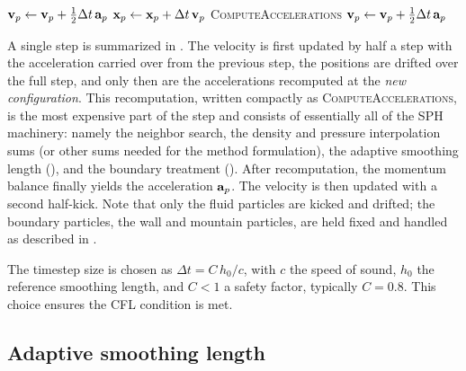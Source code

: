 \documentclass[../main.tex]{subfiles}
\begin{document}
\begin{algorithm}
	\caption{One Störmer--Verlet kick--move--kick step advancing the particle system by a time increment $\Delta t$.}
	\label{alg:VERLET}
	\begin{algobox}
	\begin{algorithmic}[1]
				\State $\mathbf{v}_p \gets \mathbf{v}_p + \tfrac{1}{2}\Delta t\, \mathbf{a}_p$ 
			\EndFor
				\State $\mathbf{x}_p \gets \mathbf{x}_p + \Delta t\, \mathbf{v}_p$ 
			\EndFor
			\State \textsc{ComputeAccelerations} 
				\State $\mathbf{v}_p \gets \mathbf{v}_p + \tfrac{1}{2}\Delta t\, \mathbf{a}_p$ 
			\EndFor
		\EndProcedure
	\end{algorithmic}
	\end{algobox}
\end{algorithm}

A single step is summarized in . The velocity is first updated by half a step with the acceleration carried over from the previous step, the positions are drifted over the full step, and only then are the accelerations recomputed at the \emph{new configuration}. This recomputation, written compactly as \textsc{ComputeAccelerations}, is the most expensive part of the step and consists of essentially all of the SPH machinery: namely the neighbor search, the density and pressure interpolation sums (or other sums needed for the method formulation), the adaptive smoothing length (), and the boundary treatment (). After recomputation, the momentum balance finally yields the acceleration $\mathbf{a}_p$. The velocity is then updated with a second half-kick.
Note that only the fluid particles are kicked and drifted; the boundary particles, \ie the wall and mountain particles, are held fixed and handled as described in .

The timestep size is chosen as $\Delta t = C\, h_0 / c$, with $c$ the speed of sound, $h_0$ the reference smoothing length, and $C < 1$ a safety factor, typically $C = 0.8$. This choice ensures the CFL condition is met.

\subsection{Adaptive smoothing length}
\label{sec:H_ADAPTIVITY}
\end{document}
